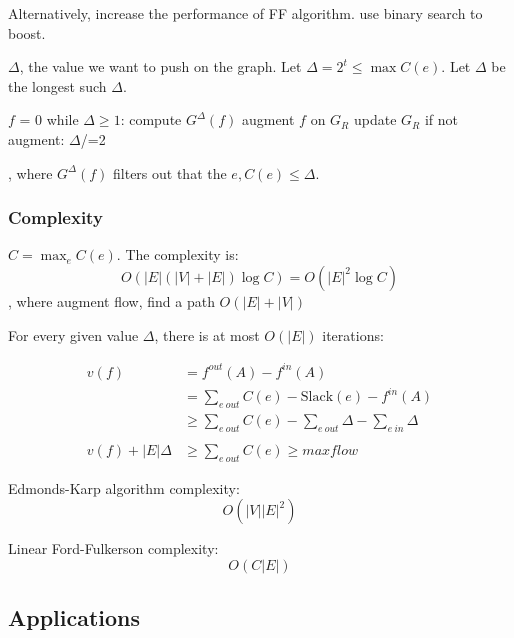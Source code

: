 \documentclass[a4paper]{report}
\theoremstyle{definition}
\begin{document}
Alternatively, increase the performance of FF algorithm. use binary search to boost. 

$\Delta$, the value we want to push on the graph. Let $\Delta=2^t \leq \max C(e)$. Let $\Delta$ be the longest such $\Delta$.
\begin{python}[mathescape]
$f$ = 0
while $\Delta\geq 1$:
  compute $G^\Delta(f)$
  augment $f$ on $G_R$
  update $G_R$
  if not augment:
    $\Delta$/=2
\end{python}
, where $G^\Delta(f)$ filters out that the $e, C(e)\leq \Delta$. 
\subsubsection{Complexity}
$C = \max_{e}C(e)$. The complexity is:
$$
O(|E|(|V|+|E|)\log C) = O(|E|^2 \log C)
$$
, where augment flow, find a path $O(|E|+|V|)$

For every given value $\Delta$, there is at most $O(|E|)$ iterations: 

\begin{align*}
v(f) &= f^{out}(A)-f^{in}(A) \\
&= \sum_{e~out}C(e)-\text{Slack}(e)-f^{in}(A) \\
&\geq \sum_{e~out}C(e)-\sum_{e~out}\Delta-\sum_{e~in}\Delta \\
\\
v(f)+|E|\Delta &\geq \sum_{e~out}C(e) \geq maxflow
\end{align*}

Edmonds-Karp algorithm complexity:
$$
O(|V||E|^2)
$$

Linear Ford-Fulkerson complexity:
$$
O(C|E|)
$$
\subsection{Applications}
\end{document}
